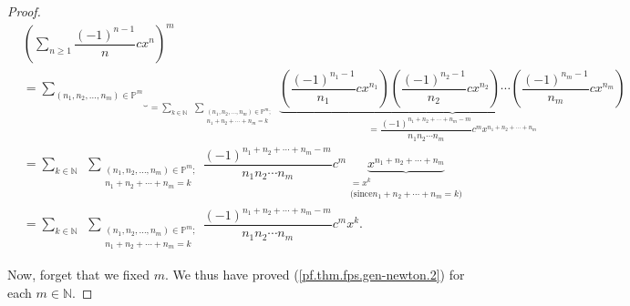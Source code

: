 \begin{proof}
\begin{align}
&  \left(  \sum_{n\geq1}\dfrac{\left(  -1\right)  ^{n-1}}{n}cx^{n}\right)
^{m}\nonumber\\
&  =\underbrace{\sum_{\left(  n_{1},n_{2},\ldots,n_{m}\right)  \in
\mathbb{P}^{m}}}_{=\sum_{k\in\mathbb{N}}\ \ \sum_{\substack{\left(
n_{1},n_{2},\ldots,n_{m}\right)  \in\mathbb{P}^{m};\\n_{1}+n_{2}+\cdots
+n_{m}=k}}}\underbrace{\left(  \dfrac{\left(  -1\right)  ^{n_{1}-1}}{n_{1}%
}cx^{n_{1}}\right)  \left(  \dfrac{\left(  -1\right)  ^{n_{2}-1}}{n_{2}%
}cx^{n_{2}}\right)  \cdots\left(  \dfrac{\left(  -1\right)  ^{n_{m}-1}}{n_{m}%
}cx^{n_{m}}\right)  }_{=\dfrac{\left(  -1\right)  ^{n_{1}+n_{2}+\cdots
+n_{m}-m}}{n_{1}n_{2}\cdots n_{m}}c^{m}x^{n_{1}+n_{2}+\cdots+n_{m}}%
}\nonumber\\
&  =\sum_{k\in\mathbb{N}}\ \ \sum_{\substack{\left(  n_{1},n_{2},\ldots
,n_{m}\right)  \in\mathbb{P}^{m};\\n_{1}+n_{2}+\cdots+n_{m}=k}}\dfrac{\left(
-1\right)  ^{n_{1}+n_{2}+\cdots+n_{m}-m}}{n_{1}n_{2}\cdots n_{m}}%
c^{m}\underbrace{x^{n_{1}+n_{2}+\cdots+n_{m}}}_{\substack{=x^{k}\\\text{(since
}n_{1}+n_{2}+\cdots+n_{m}=k\text{)}}}\nonumber\\
&  =\sum_{k\in\mathbb{N}}\ \ \sum_{\substack{\left(  n_{1},n_{2},\ldots
,n_{m}\right)  \in\mathbb{P}^{m};\\n_{1}+n_{2}+\cdots+n_{m}=k}}\dfrac{\left(
-1\right)  ^{n_{1}+n_{2}+\cdots+n_{m}-m}}{n_{1}n_{2}\cdots n_{m}}c^{m}x^{k}.
\label{pf.thm.fps.gen-newton.2}%
\end{align}


Now, forget that we fixed $m$. We thus have proved
(\ref{pf.thm.fps.gen-newton.2}) for each $m\in\mathbb{N}$.


\end{proof}
